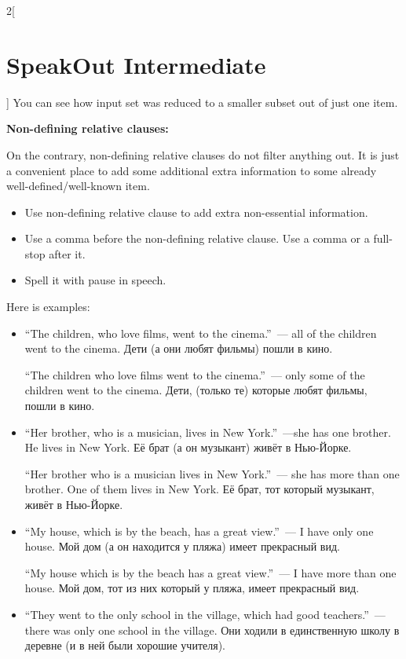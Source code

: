 \documentclass[10pt,a4paper]{article}
\newlength{\OriginalParIndent}
\newenvironment{ItemizeWithOrigParIndent}
    {\begin{itemize}[leftmargin=\OriginalParIndent]}
    {\end{itemize}}
\begin{document}
\begin{multicols}{2}[\section{SpeakOut Intermediate}]
You can see how input set was reduced to a smaller subset out of just one item.

\textbf{Non-defining relative clauses:}

On the contrary, non-defining relative clauses do not filter anything out. It is just a convenient
place to add some additional extra information to some already well-defined/well-known item.

\begin{ItemizeWithOrigParIndent}
   \item Use non-defining relative clause to add extra non-essential information.
   \item Use a comma before the non-defining relative clause. Use a comma or a full-stop after it.
   \item Spell it with pause in speech.
\end{ItemizeWithOrigParIndent}

Here is examples:
\begin{ItemizeWithOrigParIndent}
   \item ``The children, who love films, went to the cinema.''~--- all of the children went
   to the cinema. Дети (а они любят фильмы) пошли в кино.

   ``The children who love films went to the cinema.''~--- only some of the children went
   to the cinema. Дети, (только те) которые любят фильмы, пошли в кино.

   \item ``Her brother, who is a musician, lives in New York.''~---she has one brother.
   He lives in New York. Её брат (а он музыкант) живёт в Нью-Йорке.

   ``Her brother who is a musician lives in New York.''~--- she has more than one brother.
   One of them lives in New York. Её брат, тот который музыкант, живёт в Нью-Йорке.

   \item ``My house, which is by the beach, has a great view.''~--- I have only one house.
   Мой дом (а он находится у пляжа) имеет прекрасный вид.

   ``My house which is by the beach has a great view.''~--- I have more than one house.
   Мой дом, тот из них который у пляжа, имеет прекрасный вид.

   \item ``They went to the only school in the village, which had good teachers.''~--- there
   was only one school in the village. Они ходили в единственную школу в деревне
   (и в ней были хорошие учителя).


\end{ItemizeWithOrigParIndent}
\end{multicols}
\end{document}
